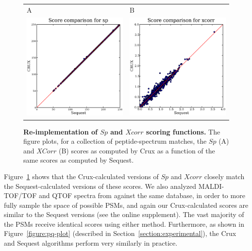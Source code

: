 \documentclass[12pt]{article}
\begin{document}
\begin{figure}
  \centering
  \begin{tabular}{ll}
    {\sf A} & {\sf B}\\
    \includegraphics[width=3in]{./Images/random-sp.eps} &
    \includegraphics[width=3in]{./Images/random-xcorr.eps} \\
  \end{tabular}
  \caption{{\bf Re-implementation of $Sp$ and $Xcorr$ scoring functions.}
  The figure plots, for a collection of peptide-spectrum matches, the
  $Sp$ ({\sf A}) and $XCorr$ ({\sf B}) scores as computed by Crux as a function of the
  same scores as computed by {\sc Sequest}.
  \label{figure:sp-xcorr}}
\end{figure}
Figure~\ref{figure:sp-xcorr} shows that the Crux-calculated versions
of $Sp$ and $Xcorr$ closely match the {\sc Sequest}-calculated
versions of these scores. We also analyzed 
MALDI-TOF/TOF and QTOF spectra from \cite{klimek:standard} against the
same database, in order to more fully sample the space of
possible PSMs, and again our Crux-calculated scores are similar to the
{\sc Sequest} versions (see the online supplement). The vast majority
of the PSMs receive identical scores using either method.
Furthermore, as shown in Figure~\ref{figure:pq-plot} (described in
Section~\ref{section:experimental}), the Crux and {\sc Sequest}
algorithms perform very similarly in practice.
\end{document}
